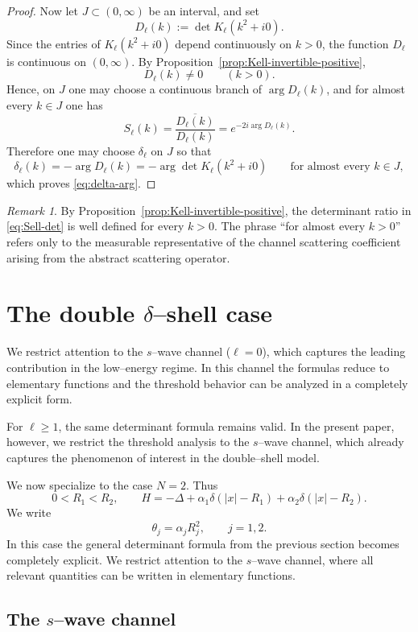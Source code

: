 \documentclass[a4paper,11pt]{article}
\numberwithin{equation}{section}
\theoremstyle{definition}
\theoremstyle{remark}
\newtheorem{rem}[thm]{Remark}
\begin{document}
\begin{proof}
Now let $J\subset(0,\infty)$ be an interval, and set
\[
D_\ell(k):=\det K_\ell(k^2+i0).
\]
Since the entries of $K_\ell(k^2+i0)$ depend continuously on $k>0$,
the function $D_\ell$ is continuous on $(0,\infty)$.
By Proposition~\ref{prop:Kell-invertible-positive},
\[
D_\ell(k)\neq0
\qquad (k>0).
\]
Hence, on $J$ one may choose a continuous branch of $\arg D_\ell(k)$, and for
almost every $k\in J$ one has
\[
S_\ell(k)
=
\frac{\overline{D_\ell(k)}}{D_\ell(k)}
=
e^{-2i\arg D_\ell(k)}.
\]
Therefore one may choose $\delta_\ell$ on $J$ so that
\[
\delta_\ell(k)
=
-\arg D_\ell(k)
=
-\arg\det K_\ell(k^2+i0)
\qquad \text{for almost every }k\in J,
\]
which proves \eqref{eq:delta-arg}.
\end{proof}
\begin{rem}
By Proposition~\ref{prop:Kell-invertible-positive}, the determinant ratio in
\eqref{eq:Sell-det} is well defined for every $k>0$.
The phrase ``for almost every $k>0$'' refers only to the measurable
representative of the channel scattering coefficient arising from the
abstract scattering operator.
\end{rem}


\section{The double $\delta$--shell case}\label{sec:double}

We restrict attention to the $s$--wave channel ($\ell=0$), which captures
the leading contribution in the low--energy regime. In this channel the
formulas reduce to elementary functions and the threshold behavior can be
analyzed in a completely explicit form.

For $\ell\ge1$, the same determinant formula remains valid. In the present
paper, however, we restrict the threshold analysis to the $s$--wave channel,
which already captures the phenomenon of interest in the double--shell model.

We now specialize to the case $N=2$. Thus
$$
0<R_1<R_2,
\qquad
H=-\Delta+\alpha_1\delta(|x|-R_1)+\alpha_2\delta(|x|-R_2).
$$
We write
$$
\theta_j=\alpha_jR_j^2,
\qquad
j=1,2.
$$
In this case the general determinant formula from the previous section becomes
completely explicit. We restrict attention to the $s$--wave channel, where all
relevant quantities can be written in elementary functions.

\subsection{The $s$--wave channel}
\end{document}
